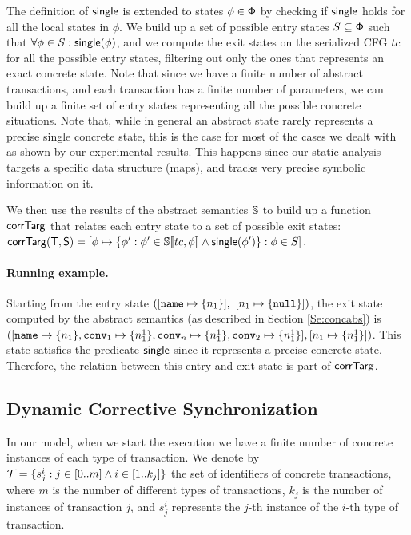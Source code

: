 The definition of $\mathsf{single}$ is extended to states $\phi \in \mathsf{\mathsf{\Phi}}$ by checking if $\mathsf{single}$ holds for all the local states in $\phi$. 
We build up a set of possible entry states $S \subseteq \mathsf{\mathsf{\Phi}}$ such that $\forall \phi \in S : \mathsf{single}(\phi)$, and we compute the exit states on the serialized CFG $tc$ for all the possible entry states, filtering out only the ones that represents an exact concrete state. Note that since we have a finite number of abstract transactions, and each transaction has a finite number of parameters, we can build up a finite set of entry states representing all the possible concrete situations. Note that, while in general an abstract state rarely represents a precise single concrete state, this is the case for most of the cases we dealt with as shown by our experimental results. This happens since our static analysis targets a specific data structure (maps), and tracks very precise symbolic information on it.

We then use the results of the abstract semantics $\mathbb{S}$ to build up a function 
$\mathsf{corrTarg}$
that relates each entry state to a set of possible exit states:
\footnotesize
$
\mathsf{corrTarg}(\mathsf{T}, \mathsf{S}) =[\phi \mapsto \{ \phi': \phi' \in \mathbb{S}\llbracket tc, \phi \rrbracket \land
\mathsf{single}(\phi')\} : \phi \in S]
$.
\normalsize

\paragraph{Running example.} Starting from the entry state $([\mathtt{name} \mapsto \{n_1\}],$ $[n_1 \mapsto \{\mathtt{null}\}])$, the exit state computed by the abstract semantics (as described in Section \ref{Se:concabs}) is
$([\mathtt{name} \mapsto \{n_1\}, \mathtt{conv}_1 \mapsto \{n^1_1\}, \mathtt{conv}_n \mapsto \{n^1_1\}, \mathtt{conv}_2 \mapsto \{n^1_1\}], [n_1 \mapsto \{n^1_1\}])$. This state satisfies the predicate $\mathsf{single}$ since it represents a precise concrete state. Therefore, the relation between this entry and exit state is part of $\mathsf{corrTarg}$.
	
\subsection{Dynamic Corrective Synchronization}
\label{sec:dynamicwarping}
In our model, when we start the execution we have a finite number of concrete instances of each type of transaction. We denote by $\concretetransactions = \{s^i_j : j \in [0..m] \land i \in [1..k_j]\}$ the set of identifiers of concrete transactions, where $m$ is the number of different types of transactions, $k_j$ is the number of instances of transaction $j$, and $s^i_j$ represents the $j$-th instance of the $i$-th type of transaction.

